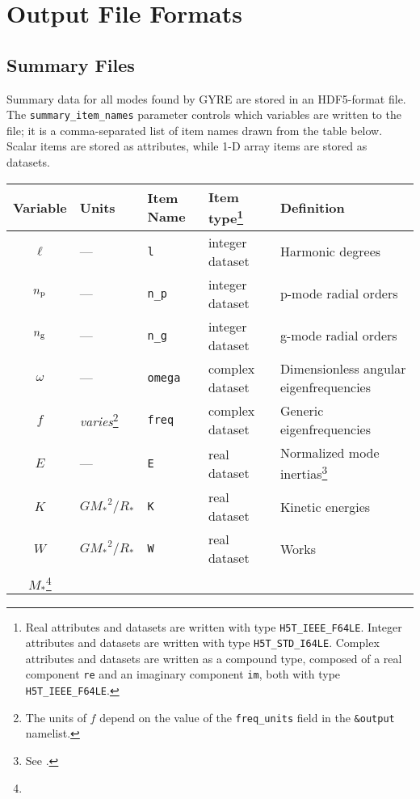 \documentclass{article}
\newcommand{\Rstar}{\ensuremath{R_{\ast}}}
\newcommand{\Mstar}{\ensuremath{M_{\ast}}}
\begin{document}
\section*{Output File Formats}

\subsection*{Summary Files}

Summary data for all modes found by GYRE are stored in an HDF5-format
file. The \texttt{summary\_item\_names} parameter controls which variables
are written to the file; it is a comma-separated list of item names
drawn from the table below. Scalar items are stored as attributes,
while 1-D array items are stored as datasets.

\begin{center}
\begin{longtable}{cllll} \hline
Variable & Units & Item Name & Item type\footnote{%
\label{foot:data-type}
Real attributes and datasets are written with type \texttt{H5T\_IEEE\_F64LE}. 
Integer attributes and datasets are written with type \texttt{H5T\_STD\_I64LE}. 
Complex attributes and datasets are written as a compound type, composed of a real component \texttt{re} and an imaginary component \texttt{im}, both with type \texttt{H5T\_IEEE\_F64LE}.} & 
Definition \\ \hline
$\ell$ & --- & \texttt{l} & integer dataset & Harmonic degrees \\
$n_{\rm p}$ & --- & \texttt{n\_p} & integer dataset & p-mode radial orders \\
$n_{\rm g}$ & --- & \texttt{n\_g} & integer dataset & g-mode radial orders \\
$\omega$ & ---   & \texttt{omega} & complex dataset & Dimensionless angular eigenfrequencies \\
$f$      & \emph{varies}\footnote{%
\label{foot:freq-units}
The units of $f$ depend on the value of the
\texttt{freq\_units} field in the \texttt{\&output} namelist.} & 
\texttt{freq} & complex dataset & Generic eigenfrequencies \\
$E$ & --- & \texttt{E} & real dataset & Normalized mode inertias\footnote{\label{foot:inertia}See \citet[][his eqn.~13]{ChrDal2012}.} \\
$K$ & $G\Mstar^{2}/\Rstar$ & \texttt{K} & real dataset & Kinetic energies \\
$W$ & $G\Mstar^{2}/\Rstar$ & \texttt{W} & real dataset & Works \\
\Mstar\footnote{%
}
\end{longtable}
\end{center}
\end{document}
